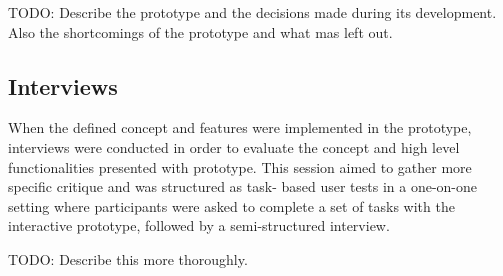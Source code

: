 TODO: Describe the prototype and the decisions made during its development. Also the shortcomings of the prototype and what mas left out.

\subsection{Interviews}
When the defined concept and features were implemented in the prototype, interviews were conducted in order to evaluate the concept and high level functionalities presented with prototype. 
This session aimed to gather more specific critique and was structured as task- based user tests in a one-on-one setting where participants were asked to complete a set of tasks with the interactive prototype, followed by a semi-structured interview.

TODO: Describe this more thoroughly.